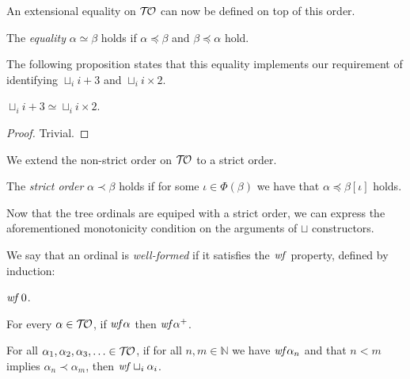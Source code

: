 An extensional equality on $\mathcal{T\!O}$ can now be defined on top of this
order.

\begin{definition}%
  The \emph{equality} $\alpha \simeq \beta$ holds if
  $\alpha \preceq \beta$ and $\beta \preceq \alpha$ hold.
\end{definition}

The following proposition states that this equality implements our
requirement of identifying $\sqcup_i i + 3$ and $\sqcup_i i \times
2$.

\begin{proposition}
  $\sqcup_i i + 3 \simeq \sqcup_i i \times 2$.
\end{proposition}
\begin{proof}
  Trivial.
\end{proof}

We extend the non-strict order on $\mathcal{T\!O}$ to a strict order.

\begin{definition}%
  The \emph{strict order} $\alpha \prec \beta$ holds if for some
  $\iota \in \Phi(\beta)$ we have that $\alpha \preceq \beta[\iota]$
  holds.
\end{definition}



Now that the tree ordinals are equiped with a strict order, we can
express the aforementioned monotonicity condition on the arguments of
$\sqcup$ constructors.

\begin{definition}%
  We say that an ordinal is \emph{well-formed} if it satisfies the
  $\mathit{wf}$ property, defined by induction:
\begin{compactenum}
  \item
    $\mathit{wf} \, 0$.
  \item
    For every $\alpha \in \mathcal{T\!O}$, if $\mathit{wf} \alpha$ then
    $\mathit{wf} \alpha^+$.
  \item
    For all $\alpha_1, \alpha_2, \alpha_3, \ldots \in \mathcal{T\!O}$, if for
    all $n,m \in \mathbb{N}$ we have $\mathit{wf} \alpha_n$ and that
    $n < m$ implies $\alpha_n \prec \alpha_m$, then $\mathit{wf}
    \sqcup_i \alpha_i$.
\end{compactenum}
\end{definition}

